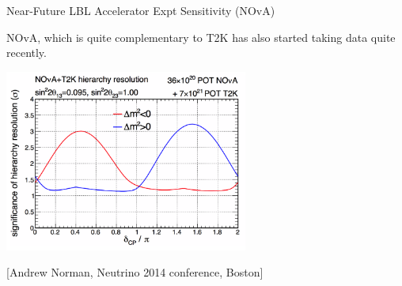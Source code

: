\begin{frame}{Near-Future LBL Accelerator Expt Sensitivity (NOvA)}

NOvA, which is quite complementary to T2K has also started taking data quite recently.\\
\begin{center}
  \includegraphics[width=0.60\textwidth]{./images/3nu/accelerator//future_sensitivity/nova/nova-hierarchy.png}\\
\end{center}
{\scriptsize \color{blue}[Andrew Norman, Neutrino 2014 conference, Boston]}

\end{frame}

%
%


